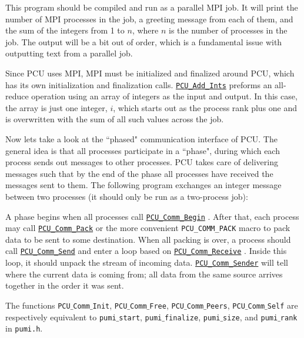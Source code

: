 \documentclass{article}
\begin{document}
This program should be compiled and run as a parallel MPI job.
It will print the number of MPI processes in the job, a greeting
message from each of them, and the sum of the integers from 1 to $n$,
where $n$ is the number of processes in the job. 
The output will be a bit out of order, which is a fundamental issue
with outputting text from a parallel job.

Since PCU uses MPI, MPI must be initialized and finalized around
PCU, which has its own initialization and finalization calls.
\href{http://scorec.rpi.edu/~dibanez/core/pcu_8c.html#abf86ddf22cc114fd2bd3f054a067c225}{\texttt{PCU\_Add\_Ints}}
preforms an all-reduce operation using
an array of integers as the input and output.
In this case, the array is just one integer, $i$, which starts
out as the process rank plus one and is overwritten with the sum
of all such values across the job.

Now lets take a look at the ``phased" communication interface of PCU.
The general idea is that all processes participate in a ``phase",
during which each process sends out messages to other processes.
PCU takes care of delivering messages such that by the end of
the phase all processes have received the messages sent to them.
The following program exchanges an integer message between two
processes (it should only be run as a two-process job):



A phase begins when all processes call
\href{http://scorec.rpi.edu/~dibanez/core/pcu_8c.html#aa1821bf79d880c38cdd91515751799ac}{\texttt{PCU\_Comm\_Begin}}
.
After that, each process may call
\href{http://scorec.rpi.edu/~dibanez/core/pcu_8c.html#afd8a6600d960129089c45fd49c1b2311}{\texttt{PCU\_Comm\_Pack}}
or the more convenient
\texttt{PCU\_COMM\_PACK}
macro to pack data to be sent to some destination.
When all packing is over, a process should call
\href{http://scorec.rpi.edu/~dibanez/core/pcu_8c.html#a263061f00174fc7a004dcb198778006c}{\texttt{PCU\_Comm\_Send}}
and enter a loop based on
\href{http://scorec.rpi.edu/~dibanez/core/pcu_8c.html#ad02bc960bcfa8e2d6b09458dca38bf53}{\texttt{PCU\_Comm\_Receive}}
.
Inside this loop, it should unpack the stream of incoming data.
\href{http://scorec.rpi.edu/~dibanez/core/pcu_8c.html#ac4577ded2ec61de4b4141e3353aac440}{\texttt{PCU\_Comm\_Sender}}
will tell where the current data is coming
from; all data from the same source arrives together in the
order it was sent.

The functions \texttt{PCU$\_$Comm$\_$Init}, \texttt{PCU$\_$Comm$\_$Free}, \texttt{PCU$\_$Comm$\_$Peers}, \texttt{PCU$\_$Comm$\_$Self} are respectively equivalent to \texttt{pumi$\_$start}, \texttt{pumi$\_$finalize}, \texttt{pumi$\_$size}, and \texttt{pumi$\_$rank} 
in \texttt{pumi.h}.
\end{document}
